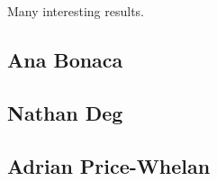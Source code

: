 Many interesting results.

\subsection{Ana Bonaca}


\subsection{Nathan Deg}


\subsection{Adrian Price-Whelan}


